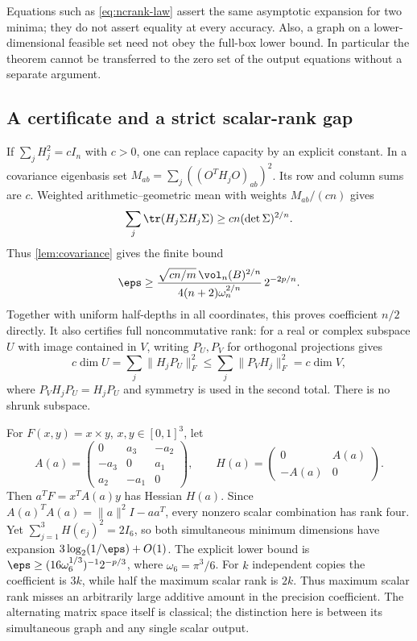 Equations such as \eqref{eq:ncrank-law} assert the same asymptotic
expansion for two minima; they do not assert equality at every accuracy.
Also, a graph on a lower-dimensional feasible set need not obey the
full-box lower bound. In particular the theorem cannot be transferred
to the zero set of the output equations without a separate argument.

\subsection{A certificate and a strict scalar-rank gap}

If $\sum_jH_j^2=cI_n$ with $c>0$, one can replace capacity by an explicit
constant. In a covariance eigenbasis set
$M_{ab}=\sum_j((O^TH_jO)_{ab})^2$. Its row and column sums are $c$.
Weighted arithmetic--geometric mean with weights $M_{ab}/(cn)$ gives
\[
 \sum_j\tr(H_j\Sigma H_j\Sigma)
 \ge cn(\det\Sigma)^{2/n}.
\]
Thus \cref{lem:covariance} gives the finite bound
\begin{equation}\label{eq:sos-certificate}
 \eps\ge
 \frac{\sqrt{cn/m}\,\vol_n(B)^{2/n}}
      {4(n+2)\omega_n^{2/n}}\,2^{-2p/n}.
\end{equation}
Together with uniform half-depths in all coordinates, this proves
coefficient $n/2$ directly. It also certifies full noncommutative rank:
for a real or complex subspace $U$ with image contained in $V$, writing
$P_U,P_V$ for orthogonal projections gives
\[
 c\dim U=\sum_j\|H_jP_U\|_F^2
 \le\sum_j\|P_VH_j\|_F^2=c\dim V,
\]
where $P_VH_jP_U=H_jP_U$ and symmetry is used in the second total.
There is no shrunk subspace.

For $F(x,y)=x\times y$, $x,y\in[0,1]^3$, let
\[
 A(a)=\begin{pmatrix}0&a_3&-a_2\\-a_3&0&a_1\\a_2&-a_1&0\end{pmatrix},
 \qquad H(a)=\begin{pmatrix}0&A(a)\\-A(a)&0\end{pmatrix}.
\]
Then $a^TF=x^TA(a)y$ has Hessian $H(a)$.
Since $A(a)^TA(a)=\|a\|^2I-aa^T$, every nonzero scalar combination
has rank four. Yet $\sum_{j=1}^3H(e_j)^2=2I_6$, so both simultaneous
minimum dimensions have expansion $3\log_2(1/\eps)+O(1)$.
The explicit lower bound is
$\eps\ge(16\omega_6^{1/3})^{-1}2^{-p/3}$, where $\omega_6=\pi^3/6$.
For $k$ independent copies the coefficient is $3k$, while half the
maximum scalar rank is $2k$. Thus maximum scalar rank misses an
arbitrarily large additive amount in the precision coefficient.
The alternating matrix space itself is classical; the distinction here
is between its simultaneous graph and any single scalar output.

